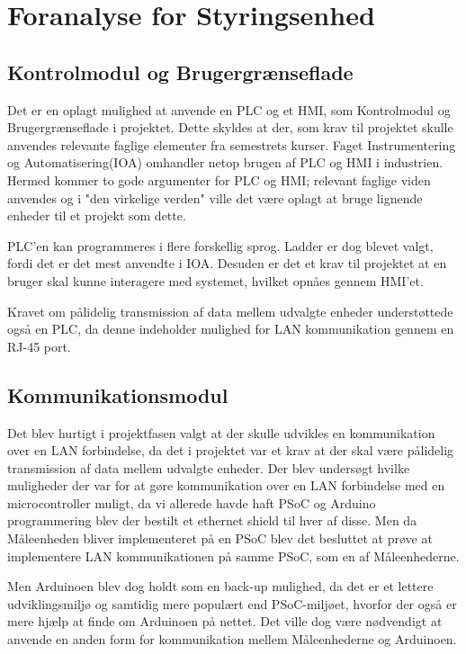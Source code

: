 
\section{Foranalyse for Styringsenhed}

\subsection{Kontrolmodul og Brugergrænseflade}
Det er en oplagt mulighed at anvende en PLC og et HMI, som Kontrolmodul og Brugergrænseflade i projektet. Dette skyldes at der, som krav til projektet skulle anvendes relevante faglige elementer fra semestrets kurser. Faget Instrumentering og Automatisering(IOA) omhandler netop brugen af PLC og HMI i industrien. Hermed kommer to gode argumenter for PLC og HMI; relevant faglige viden anvendes og i "den virkelige verden" ville det være oplagt at bruge lignende enheder til et projekt som dette.

PLC'en kan programmeres i flere forskellig sprog. Ladder er dog blevet valgt, fordi det er det mest anvendte i IOA. Desuden er det et krav til projektet at en bruger skal kunne interagere med systemet, hvilket opnåes gennem HMI'et.

Kravet om pålidelig transmission af data mellem udvalgte enheder understøttede også en PLC, da denne indeholder mulighed for LAN kommunikation gennem en RJ-45 port.

\subsection{Kommunikationsmodul}
Det blev hurtigt i projektfasen valgt at der skulle udvikles en kommunikation over en LAN forbindelse, da det i projektet var et krav at der skal være pålidelig transmission af data mellem udvalgte enheder. Der blev undersøgt hvilke muligheder der var for at gøre kommunikation over en LAN forbindelse med en microcontroller muligt, da vi allerede havde haft PSoC og Arduino programmering blev der bestilt et ethernet shield til hver af disse. Men da Måleenheden bliver implementeret på en PSoC blev det besluttet at prøve at implementere LAN kommunikationen på samme PSoC, som en af Måleenhederne. 

Men Arduinoen blev dog holdt som en back-up mulighed, da det er et lettere udviklingsmiljø og samtidig mere populært end PSoC-miljøet, hvorfor der også er mere hjælp at finde om Arduinoen på nettet. Det ville dog være nødvendigt at anvende en anden form for kommunikation mellem Måleenhederne og Arduinoen. 






